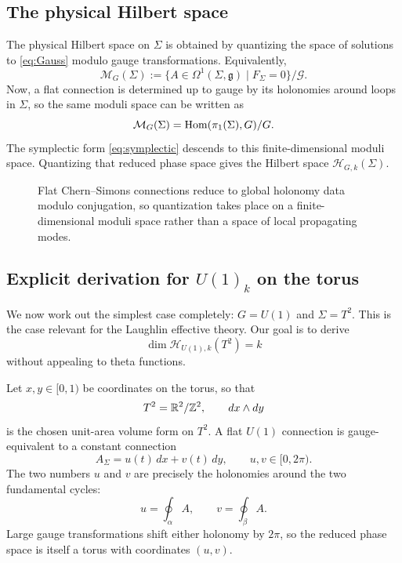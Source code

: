 \subsection{The physical Hilbert space}

The physical Hilbert space on $\Sigma$ is obtained by quantizing the space of solutions to \eqref{eq:Gauss} modulo gauge transformations. Equivalently,
\begin{equation}\label{eq:moduli}
\mathcal{M}_G(\Sigma)
:=
\{A\in \Omega^1(\Sigma,\mathfrak{g}) \mid F_\Sigma = 0\}/\mathcal{G}.
\end{equation}
Now, a flat connection is determined up to gauge by its holonomies around loops in $\Sigma$, so the same moduli space can be written as
\begin{equation}\label{eq:moduli-hom}
\mathcal{M}_G(\Sigma) = \operatorname{Hom}(\pi_1(\Sigma),G)/G.
\end{equation}
The symplectic form \eqref{eq:symplectic} descends to this finite-dimensional moduli space. Quantizing that reduced phase space gives the Hilbert space $\mathcal{H}_{G,k}(\Sigma)$.

\begin{figure}[h]
    \centering
    
    \caption{Flat Chern--Simons connections reduce to global holonomy data modulo conjugation, so quantization takes place on a finite-dimensional moduli space rather than a space of local propagating modes.}
    \label{fig:flat-moduli}
\end{figure}

\subsection{Explicit derivation for $U(1)_k$ on the torus}\label{subsec:U1-torus}

We now work out the simplest case completely: $G=U(1)$ and $\Sigma = T^2$. This is the case relevant for the Laughlin effective theory. Our goal is to derive
\begin{equation}\label{eq:dim-U1-goal}
\dim \mathcal{H}_{U(1),k}(T^2) = k
\end{equation}
without appealing to theta functions.

\medskip

\noindent Let $x,y\in [0,1)$ be coordinates on the torus, so that
\begin{equation*}
T^2 = \mathbb{R}^2/\mathbb{Z}^2,
\qquad
dx\wedge dy
\end{equation*}
is the chosen unit-area volume form on $T^2$. A flat $U(1)$ connection is gauge-equivalent to a constant connection
\begin{equation}\label{eq:torus-flat-connection}
A_\Sigma = u(t)\,dx + v(t)\,dy,
\qquad
u,v\in [0,2\pi).
\end{equation}
The two numbers $u$ and $v$ are precisely the holonomies around the two fundamental cycles:
\begin{equation*}
u = \oint_{\alpha}A,
\qquad
v = \oint_{\beta}A.
\end{equation*}
Large gauge transformations shift either holonomy by $2\pi$, so the reduced phase space is itself a torus with coordinates $(u,v)$.

